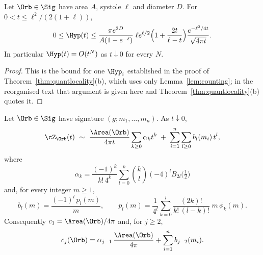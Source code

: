 \begin{lemma}\label{lem:hypbound}
Let $\Orb\in\Sig$ have area $A$, systole $\ell$ and diameter $D$. For $0<t\le\ell^2/(2(1+\ell))$,
\[
  0\le\Hyp(t)\le\frac{\pi e^{3D}}{A(1-e^{-\ell})}\;\ell e^{\ell/2}\Big(1+\frac{2t}{\ell-t}\Big)\frac{e^{-\ell^2/4t}}{\sqrt{4\pi t}} .
\]
In particular $\Hyp(t)=O(t^N)$ as $t\downarrow0$ for every $N$.
\end{lemma}

\begin{proof}
This is the bound for one $\Hyp_i$ established in the proof of Theorem~\ref{thm:quantlocality}(b), which
uses only Lemma~\ref{lem:counting}; in the reorganised text that argument is given here and
Theorem~\ref{thm:quantlocality}(b) quotes it.
\end{proof}

\begin{proposition}\label{prop:heatinput}
Let $\Orb\in\Sig$ have signature $(g;m_1,\dots,m_n)$. As $t\downarrow0$,
\[
  \cZ_\Orb(t)\ \sim\ \frac{\Area(\Orb)}{4\pi t}\sum_{k\ge0}\alpha_kt^k\;+\;\sum_{i=1}^n\sum_{l\ge0}b_l(m_i)\,t^l,
\]
where
\begin{equation}\label{eq:alphak}
  \alpha_k=\frac{(-1)^k}{k!\,4^k}\sum_{l=0}^k\binom kl(-4)^lB_{2l}\big(\tfrac12\big)
\end{equation}
and, for every integer $m\ge1$,
\begin{equation}\label{eq:bl}
  b_l(m)=\frac{(-1)^l\,p_l(m)}{m},\qquad
  p_l(m)=\frac1{4^l}\sum_{k=0}^{l}\frac{(2k)!}{k!\,(l-k)!}\;m\,\phi_k(m).
\end{equation}
Consequently $c_1=\Area(\Orb)/4\pi$ and, for $j\ge2$,
\begin{equation}\label{eq:cj}
  c_j(\Orb)=\alpha_{j-1}\,\frac{\Area(\Orb)}{4\pi}+\sum_{i=1}^nb_{j-2}(m_i).
\end{equation}
\end{proposition}

